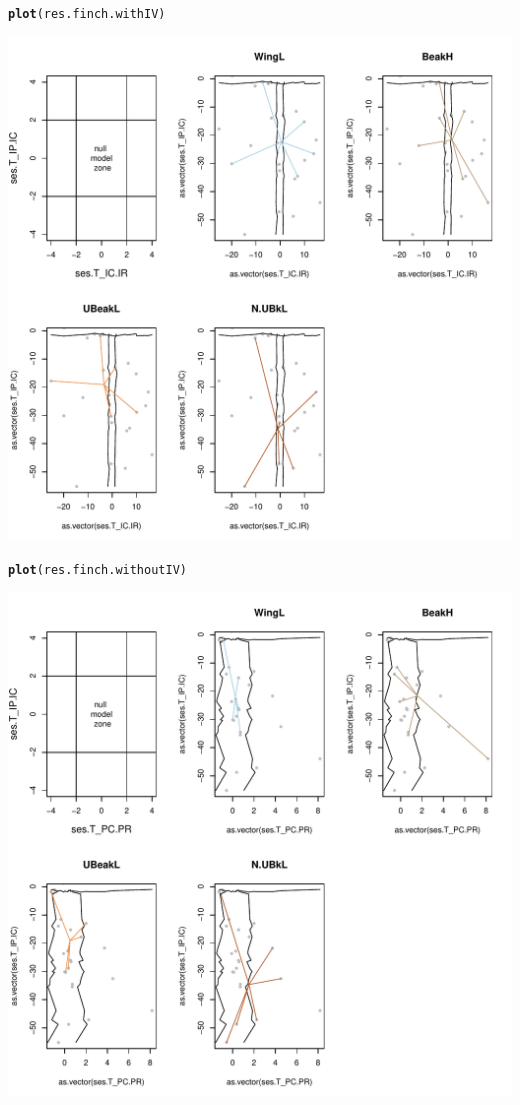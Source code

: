 \documentclass[12pt]{article}\usepackage[]{graphicx}\usepackage[]{color}
\makeatletter
\def\maxwidth{ %
  \ifdim\Gin@nat@width>\linewidth
    \linewidth
  \else
    \Gin@nat@width
  \fi
}
\newcommand{\hlstd}[1]{\textcolor[rgb]{0.345,0.345,0.345}{#1}}%
\newcommand{\hlkwd}[1]{\textcolor[rgb]{0.737,0.353,0.396}{\textbf{#1}}}%
\newenvironment{kframe}{%
 \def\at@end@of@kframe{}%
 \ifinner\ifhmode%
  \def\at@end@of@kframe{\end{minipage}}%
  \begin{minipage}{\columnwidth}%
 \fi\fi%
 \def\FrameCommand##1{\hskip\@totalleftmargin \hskip-\fboxsep
 \colorbox{shadecolor}{##1}\hskip-\fboxsep
     \hskip-\linewidth \hskip-\@totalleftmargin \hskip\columnwidth}%
 \MakeFramed {\advance\hsize-\width
   \@totalleftmargin\z@ \linewidth\hsize
   \@setminipage}}%
 {\par\unskip\endMakeFramed%
 \at@end@of@kframe}
\newenvironment{knitrout}{}{} %
\makeatother
\begin{document}
\begin{knitrout}
\begin{kframe}
\begin{alltt}
\hlkwd{plot}\hlstd{(res.finch.withIV)}
\end{alltt}
\end{kframe}
\includegraphics[width=\maxwidth]{figure/unnamed-chunk-391} 
\begin{kframe}\begin{alltt}
\hlkwd{plot}\hlstd{(res.finch.withoutIV)}
\end{alltt}
\end{kframe}
\includegraphics[width=\maxwidth]{figure/unnamed-chunk-392} 

\end{knitrout}
\end{document}

